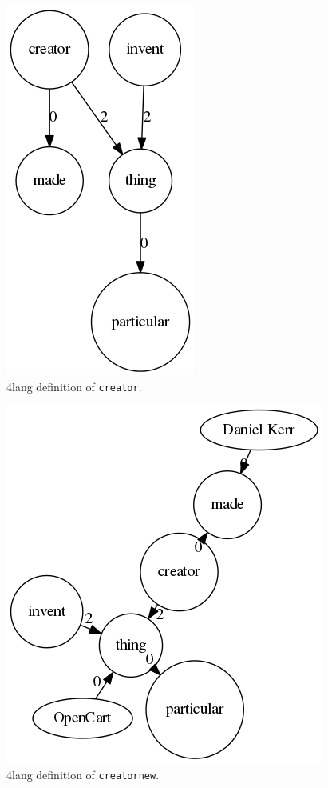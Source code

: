 \documentclass[10pt, a4paper]{article}
\begin{document}
\begin{figure}
\centering
    \includegraphics[scale=0.5]{creator.png}
\caption{4lang definition of \texttt{creator}.}
\label{fig:creator}
\end{figure}

\begin{figure}
\centering
    \includegraphics[scale=0.5]{creatornew.png}
\caption{4lang definition of \texttt{creatornew}.}
\label{fig:creatornew}
\end{figure}
\end{document}
